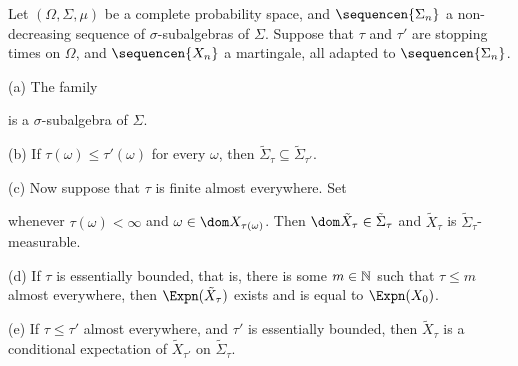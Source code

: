  Let $(\Omega,\Sigma,\mu)$ be a complete probability
space, and $\sequencen{\Sigma_n}$ a non-decreasing sequence of
$\sigma$-subalgebras of $\Sigma$.   Suppose that $\tau$ and $\tau'$ are
stopping times on $\Omega$, and $\sequencen{X_n}$ a martingale, all
adapted to $\sequencen{\Sigma_n}$.

(a) The family


\noindent is a $\sigma$-subalgebra of $\Sigma$.

(b) If $\tau(\omega)\le\tau'(\omega)$ for every
$\omega$, then $\tilde\Sigma_{\tau}\subseteq\tilde\Sigma_{\tau'}$.

(c) Now suppose that $\tau$ is finite almost everywhere.   Set


\noindent whenever $\tau(\omega)<\infty$ and
$\omega\in\dom X_{\tau(\omega)}$.   Then
$\dom\tilde X_{\tau}\in\tilde\Sigma_{\tau}$ and $\tilde X_{\tau}$ is
$\tilde\Sigma_{\tau}$-measurable.

(d) If $\tau$ is essentially bounded, that is, there is some
$m\in\Bbb N$ such that $\tau\le m$ almost everywhere, then
$\Expn(\tilde X_{\tau})$ exists and is equal to $\Expn(X_0)$.

(e) If $\tau\le\tau'$ almost everywhere, and $\tau'$ is essentially
bounded, then $\tilde X_{\tau}$ is a conditional expectation of
$\tilde X_{\tau'}$ on $\tilde\Sigma_{\tau}$.

